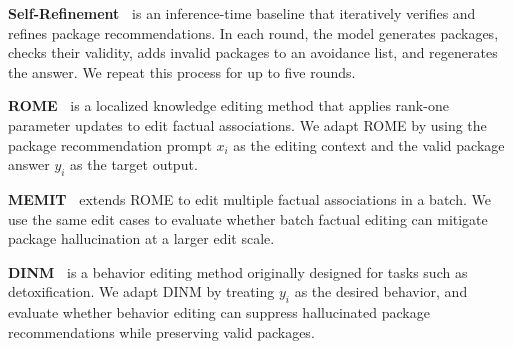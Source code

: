 \noindent\textbf{Self-Refinement~\cite{spracklen2025we}} is an inference-time baseline that iteratively verifies and refines package recommendations. 
In each round, the model generates packages, checks their validity, adds invalid packages to an avoidance list, and regenerates the answer. 
We repeat this process for up to five rounds.


\noindent\textbf{ROME~\cite{meng2022rome}} is a localized knowledge editing method that applies rank-one parameter updates to edit factual associations. 
We adapt ROME by using the package recommendation prompt $x_i$ as the editing context and the valid package answer $y_i$ as the target output.




\noindent\textbf{MEMIT~\cite{meng2023memit}} extends ROME to edit multiple factual associations in a batch. 
We use the same edit cases to evaluate whether batch factual editing can mitigate package hallucination at a larger edit scale.


\noindent\textbf{DINM~\cite{wang2024detoxifying}} is a behavior editing method originally designed for tasks such as detoxification. 
We adapt DINM by treating $y_i$ as the desired behavior, and evaluate whether behavior editing can suppress hallucinated package recommendations while preserving valid packages.





